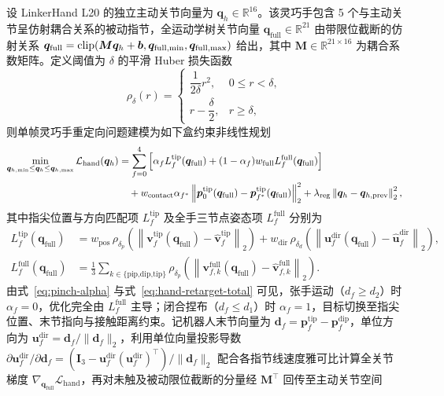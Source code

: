 设 LinkerHand L20 的独立主动关节向量为 $\bm{q}_h \in \mathbb{R}^{16}$。该灵巧手包含 5 个与主动关节呈仿射耦合关系的被动指节，全运动学树关节向量 $\bm{q}_{\text{full}} \in \mathbb{R}^{21}$ 由带限位截断的仿射关系 $\bm{q}_{\text{full}} = \operatorname{clip}(\bm{M}\bm{q}_h + \bm{b}, \bm{q}_{\text{full},\min}, \bm{q}_{\text{full},\max})$ 给出，其中 $\bm{M} \in \mathbb{R}^{21\times 16}$ 为耦合系数矩阵。定义阈值为 $\delta$ 的平滑 Huber 损失函数
\begin{equation}
  \rho_{\delta}(r) = \begin{cases}
    \dfrac{1}{2\delta} r^2, & 0 \le r < \delta, \\[6pt]
    r - \dfrac{\delta}{2}, & r \ge \delta,
  \end{cases}
  \label{eq:huber-def}
\end{equation}
则单帧灵巧手重定向问题建模为如下盒约束非线性规划
\begin{align}
  \min_{\bm{q}_{h,\min} \le \bm{q}_h \le \bm{q}_{h,\max}} \mathcal{L}_{\text{hand}}(\bm{q}_h)
  &= \sum_{f=0}^{4} \Big[ \alpha_f L_f^{\text{tip}}(\bm{q}_{\text{full}}) + (1 - \alpha_f) w_{\text{full}} L_f^{\text{full}}(\bm{q}_{\text{full}}) \Big] \notag\\
  &\quad + w_{\text{contact}} \alpha_{f^*} \left\|\bm{p}_0^{\text{tip}}(\bm{q}_{\text{full}}) - \bm{p}_{f^*}^{\text{tip}}(\bm{q}_{\text{full}})\right\|_2^2
  + \lambda_{\text{reg}} \left\|\bm{q}_h - \bm{q}_{h,\text{prev}}\right\|_2^2,
  \label{eq:hand-retarget-total}
\end{align}
其中指尖位置与方向匹配项 $L_f^{\text{tip}}$ 及全手三节点姿态项 $L_f^{\text{full}}$ 分别为
\begin{align}
  L_f^{\text{tip}}(\bm{q}_{\text{full}}) &= w_{\text{pos}}\,\rho_{\delta_p}\!\left(\left\|\bm{v}_f^{\text{tip}}(\bm{q}_{\text{full}}) - \hat{\bm{v}}_f^{\text{tip}}\right\|_2\right)
  + w_{\text{dir}}\,\rho_{\delta_d}\!\left(\left\|\bm{u}_f^{\text{dir}}(\bm{q}_{\text{full}}) - \hat{\bm{u}}_f^{\text{dir}}\right\|_2\right), \label{eq:loss-tip}\\
  L_f^{\text{full}}(\bm{q}_{\text{full}}) &= \frac{1}{3} \sum_{k \in \{\text{pip,dip,tip}\}} \rho_{\delta_p}\!\left(\left\|\bm{v}_{f,k}^{\text{full}}(\bm{q}_{\text{full}}) - \hat{\bm{v}}_{f,k}^{\text{full}}\right\|_2\right). \label{eq:loss-full}
\end{align}
由式~\eqref{eq:pinch-alpha} 与式~\eqref{eq:hand-retarget-total} 可见，张手运动（$d_f \ge d_2$）时 $\alpha_f = 0$，优化完全由 $L_f^{\text{full}}$ 主导；闭合捏布（$d_f \le d_1$）时 $\alpha_f = 1$，目标切换至指尖位置、末节指向与接触距离约束。记机器人末节向量为 $\bm{d}_f = \bm{p}_f^{\text{tip}} - \bm{p}_f^{\text{dip}}$，单位方向为 $\bm{u}_f^{\text{dir}} = \bm{d}_f / \|\bm{d}_f\|_2$，利用单位向量投影导数 $\partial \bm{u}_f^{\text{dir}} / \partial \bm{d}_f = (\bm{I}_3 - \bm{u}_f^{\text{dir}}(\bm{u}_f^{\text{dir}})^{\top}) / \|\bm{d}_f\|_2$ 配合各指节线速度雅可比计算全关节梯度 $\nabla_{\bm{q}_{\text{full}}}\mathcal{L}_{\text{hand}}$，再对未触及被动限位截断的分量经 $\bm{M}^{\top}$ 回传至主动关节空间
